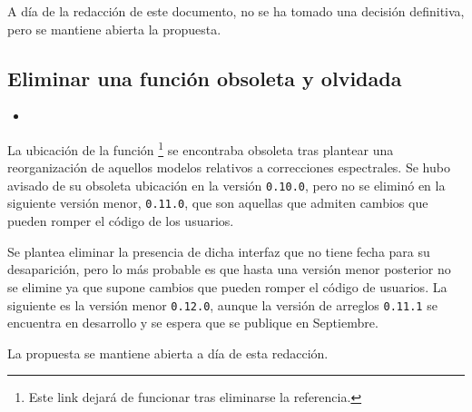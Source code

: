A día de la redacción de este documento, no se ha tomado una decisión definitiva, pero se mantiene abierta la propuesta.

\subsection{Eliminar una función obsoleta y olvidada}

\begin{itemize}
    \item {}
\end{itemize}

La ubicación de la función \footnote{Este link dejará de funcionar tras eliminarse la referencia.} se encontraba obsoleta tras plantear una reorganización de aquellos modelos relativos a correcciones espectrales. Se hubo avisado de su obsoleta ubicación en la versión \texttt{0.10.0}, pero no se eliminó en la siguiente versión menor, \texttt{0.11.0}, que son aquellas que admiten cambios que pueden romper el código de los usuarios.

Se plantea eliminar la presencia de dicha interfaz que no tiene fecha para su desaparición, pero lo más probable es que hasta una versión menor posterior no se elimine ya que supone cambios que pueden romper el código de usuarios. La siguiente es la versión menor \texttt{0.12.0}, aunque la versión de arreglos \texttt{0.11.1} se encuentra en desarrollo y se espera que se publique en Septiembre.

La propuesta se mantiene abierta a día de esta redacción.

